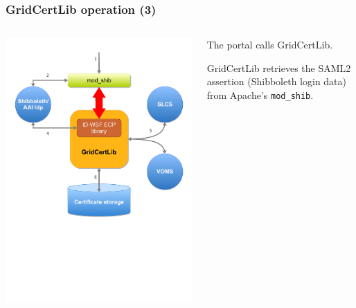 \documentclass{beamer}
\newcommand{\+}{\vspace{1em}}
\begin{document}
\begin{frame}
  \frametitle{GridCertLib operation (3)}
  \begin{columns}
    \begin{column}{0.5\textwidth}
    \includegraphics[width=\linewidth,viewport=0 300 600 650]{architecture3}
    \end{column}
    \begin{column}{0.5\textwidth}
      \begin{center}
        The portal calls GridCertLib.
        
        \+ GridCertLib retrieves the SAML2 assertion (Shibboleth login
        data) from Apache's \texttt{mod\_shib}.
      \end{center}
    \end{column}
  \end{columns}
\end{frame}
\end{document}
